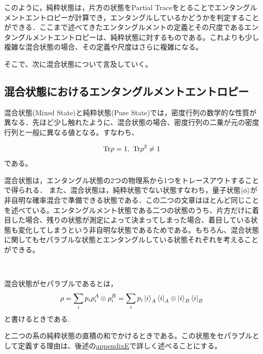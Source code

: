 このように，純粋状態は，片方の状態をPartial Traceをとることでエンタングルメントエントロピーが計算でき，エンタングルしているかどうかを判定することができる．ここまで述べてきたエンタングルメントの定義とその尺度であるエンタングルメントエントロピーは、純粋状態に対するものである。これよりも少し複雑な混合状態の場合、その定義や尺度はさらに複雑になる。

そこで、次に混合状態について言及していく。
\subsection{混合状態におけるエンタングルメントエントロピー}

混合状態(Mixed State)と純粋状態(Pure State)では，密度行列の数学的な性質が異なる．先ほど少し触れたように、混合状態の場合、密度行列の二乗が元の密度行列と一般に異なる値となる。すなわち、

\begin{equation}
  \rm{Tr}\rho=1, \ \rm{Tr}\rho^2\neq 1
\end{equation}
である。

混合状態は，エンタングル状態の2つの物理系から1つをトレースアウトすることで得られる．
また、混合状態は，純粋状態でない状態すなわち，量子状態$\ket{\phi}$が非自明な確率混合で準備できる状態である．この二つの文章はほとんど同じことを述べている。エンタングルメント状態である二つの状態のうち、片方だけに着目した場合、残りの状態が測定によって決まってしまった場合、着目している状態も変化してしまうという非自明な状態であるためである。もちろん、混合状態に関してもセパラブルな状態とエンタングルしている状態それぞれを考えることができる。


\begin{empheqboxed}
  \

混合状態がセパラブルであるとは，
\begin{equation}
  \label{30}
  \rho=\sum_{i}p_i\rho^{A}_{i}\otimes\rho^{B}_{i}=\sum_{i}p_i\ket{i}_A\bra{i}_{A}\otimes\ket{i}_B\bra{i}_{B}
  \end{equation}
  と書けるときである.
\end{empheqboxed}
と二つの系の純粋状態の直積の和でかけるときである。この状態をセパラブルとして定義する理由は、後述の\hyperlink{appendixE}{appendixE}で詳しく述べることにする。

